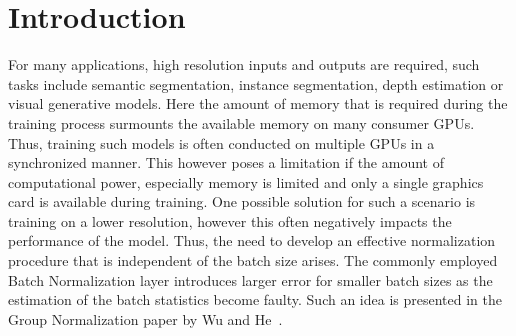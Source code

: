 \section{Introduction}\label{sec:introduction}
For many applications, high resolution inputs and outputs are required, such tasks include semantic segmentation, instance segmentation, depth estimation or visual generative models.
Here the amount of memory that is required during the training process surmounts the available memory on many consumer GPUs.
Thus, training such models is often conducted on multiple GPUs in a synchronized manner.
This however poses a limitation if the amount of computational power, especially memory is limited and only a single graphics card is available during training.
One possible solution for such a scenario is training on a lower resolution, however this often negatively impacts the performance of the model.
Thus, the need to develop an effective normalization procedure that is independent of the batch size arises.
The commonly employed Batch Normalization layer introduces larger error for smaller batch sizes as the estimation of the batch statistics become faulty.
Such an idea is presented in the Group Normalization paper by Wu and He~\cite{DBLP:journals/corr/abs-1803-08494}.
